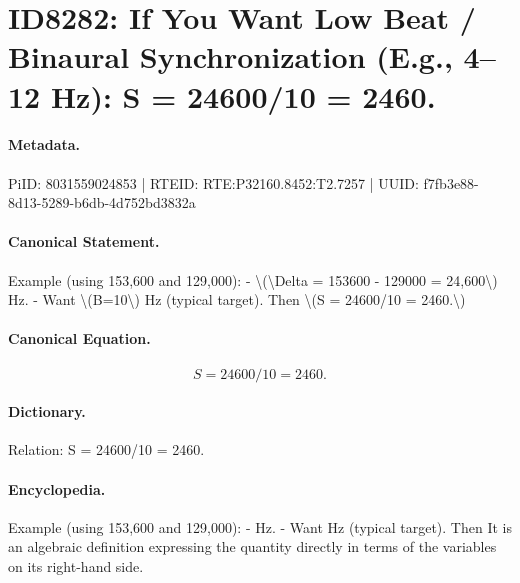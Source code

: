 \section*{ID8282: If You Want Low Beat / Binaural Synchronization (E.g., 4–12 Hz): S = 24600/10 = 2460.}
\paragraph{Metadata.}
PiID: 8031559024853 | RTEID: RTE:P32160.8452:T2.7257 | UUID: f7fb3e88-8d13-5289-b6db-4d752bd3832a

\paragraph{Canonical Statement.}
Example (using 153,600 and 129,000): - \textbackslash{}(\textbackslash{}Delta = 153600 - 129000 = 24,600\textbackslash{}) Hz. - Want \textbackslash{}(B=10\textbackslash{}) Hz (typical target). Then \textbackslash{}(S = 24600/10 = 2460.\textbackslash{})

\paragraph{Canonical Equation.}
\[
S = 24600/10 = 2460.
\]

\paragraph{Dictionary.}
Relation: S = 24600/10 = 2460.

\paragraph{Encyclopedia.}
Example (using 153,600 and 129,000): - Hz. - Want Hz (typical target). Then It is an algebraic definition expressing the quantity directly in terms of the variables on its right-hand side.
